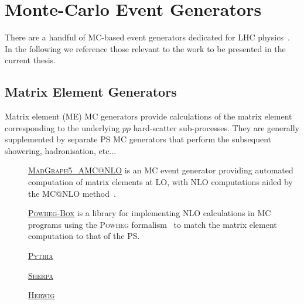 %
%

\section{Monte-Carlo Event Generators}
\label{sec:mc_gen}

There are a handful of MC-based event generators dedicated for LHC physics~\cite{Buckley:2011ms}.
In the following we reference those relevant to the work to be presented in the current
thesis.

\subsection{Matrix Element Generators}
\label{sec:mc_gen_me}

Matrix element (ME) MC generators provide calculations of the matrix element corresponding
to the underlying $pp$ hard-scatter sub-processes.
They are generally supplemented by separate PS MC generators that perform the subsequent
showering, hadronisation, etc...

\begin{description}
    \item[] \underline{\textsc{MadGraph5\_AMC@NLO}} \cite{MGFive} is an MC event generator providing automated
        computation of matrix elements at LO, with NLO computations aided by the MC@NLO method~\cite{AMCNLO}.
    \item[] \underline{\textsc{Powheg-Box}} \cite{POWHEGBOX} is a library for implementing NLO calculations in
        MC programs using the \textsc{Powheg} formalism~\cite{POWHEGMETHOD} to match the matrix element
        computation to that of the PS.
    \item[] \underline{\textsc{Pythia}}
    \item[] \underline{\textsc{Sherpa}}
    \item[] \underline{\textsc{Herwig}}
\end{description}

%
%


